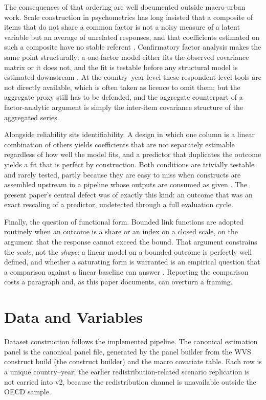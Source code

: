 \documentclass[11pt]{article}
\begin{document}
The consequences of that ordering are well documented outside macro-urban work. Scale construction in psychometrics has long insisted that a composite of items that do not share a common factor is not a noisy measure of a latent variable but an average of unrelated responses, and that coefficients estimated on such a composite have no stable referent \parencite{Cronbach1951Alpha,Nunnally1978PsychometricTheory,Bollen1989Structural}. Confirmatory factor analysis makes the same point structurally: a one-factor model either fits the observed covariance matrix or it does not, and the fit is testable before any structural model is estimated downstream \parencite{Joreskog1979Advances}. At the country--year level these respondent-level tools are not directly available, which is often taken as licence to omit them; but the aggregate proxy still has to be defended, and the aggregate counterpart of a factor-analytic argument is simply the inter-item covariance structure of the aggregated series.

Alongside reliability sits identifiability. A design in which one column is a linear combination of others yields coefficients that are not separately estimable regardless of how well the model fits, and a predictor that duplicates the outcome yields a fit that is perfect by construction. Both conditions are trivially testable and rarely tested, partly because they are easy to miss when constructs are assembled upstream in a pipeline whose outputs are consumed as given \parencite{SimmonsNelsonSimonsohn2011FalsePositive,Bishop2019Reproducibility}. The present paper's central defect was of exactly this kind: an outcome that was an exact rescaling of a predictor, undetected through a full evaluation cycle.

Finally, the question of functional form. Bounded link functions are adopted routinely when an outcome is a share or an index on a closed scale, on the argument that the response cannot exceed the bound. That argument constrains the \emph{scale}, not the \emph{shape}: a linear model on a bounded outcome is perfectly well defined, and whether a saturating form is warranted is an empirical question that a comparison against a linear baseline can answer \parencite{Hastie2009ESL,McCullagh1989Generalized}. Reporting the comparison costs a paragraph and, as this paper documents, can overturn a framing.

\section{Data and Variables}
Dataset construction follows the implemented pipeline. The canonical estimation panel is the canonical panel file, generated by the panel builder from the WVS construct build (the construct builder) and the macro covariate table. Each row is a unique country--year; the earlier redistribution-related scenario replication is not carried into v2, because the redistribution channel is unavailable outside the OECD sample.
\end{document}

